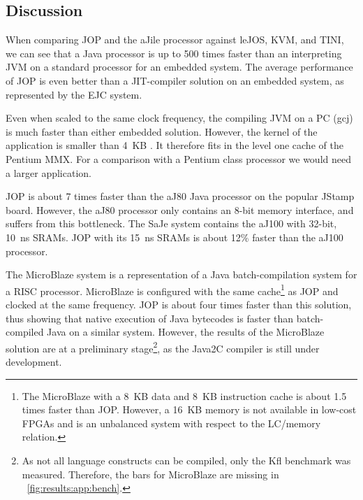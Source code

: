 

\subsection{Discussion}
\label{sec:perf:disc}

When comparing JOP and the aJile processor against leJOS, KVM, and
TINI, we can see that a Java processor is up to 500 times faster
than an interpreting JVM on a standard processor for an embedded
system. The average performance of JOP is even better than a
JIT-compiler solution on an embedded system, as represented by the
EJC system.

Even when scaled to the same clock frequency, the compiling JVM on a
PC (gcj) is much faster than either embedded solution. However, the
kernel of the application is smaller than 4~KB
\cite{jop:jtres_cache}. It therefore fits in the level one cache of
the Pentium MMX. For a comparison with a Pentium class processor we
would need a larger application.

JOP is about 7 times faster than the aJ80 Java processor on the
popular JStamp board. However, the aJ80 processor only contains an
8-bit memory interface, and suffers from this bottleneck. The SaJe
system contains the aJ100 with 32-bit, 10~ns SRAMs. JOP with its
15~ns SRAMs is about 12\% faster than the aJ100 processor.

The MicroBlaze system is a representation of a Java
batch-compilation system for a RISC processor. MicroBlaze is
configured with the same cache\footnote{The MicroBlaze with a 8~KB
data and 8~KB instruction cache is about 1.5 times faster than JOP.
However, a 16~KB memory is not available in low-cost FPGAs and is an
unbalanced system with respect to the LC/memory relation.} as JOP
and clocked at the same frequency. JOP is about four times faster
than this solution, thus showing that native execution of Java
bytecodes is faster than batch-compiled Java on a similar system.
However, the results of the MicroBlaze solution are at a preliminary
stage\footnote{As not all language constructs can be compiled, only
the Kfl benchmark was measured. Therefore, the bars for MicroBlaze
are missing in \figurename~\ref{fig:results:app:bench}.}, as the
Java2C compiler \cite{Java2C} is still under development.


